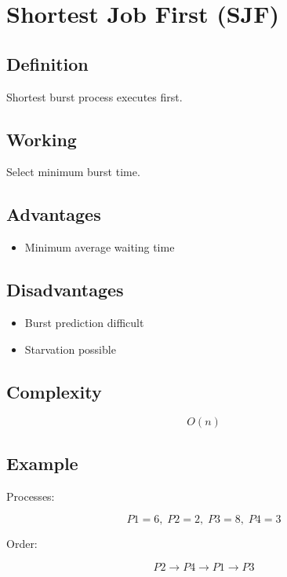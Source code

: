 \section{Shortest Job First (SJF)}

\subsection{Definition}

Shortest burst process executes first.

\subsection{Working}

Select minimum burst time.

\subsection{Advantages}

\begin{itemize}
\item Minimum average waiting time
\end{itemize}

\subsection{Disadvantages}

\begin{itemize}
\item Burst prediction difficult
\item Starvation possible
\end{itemize}

\subsection{Complexity}

\[
O(n)
\]

\subsection{Example}

Processes:

\[
P1=6,\;
P2=2,\;
P3=8,\;
P4=3
\]

Order:

\[
P2 \rightarrow P4 \rightarrow P1 \rightarrow P3
\]

